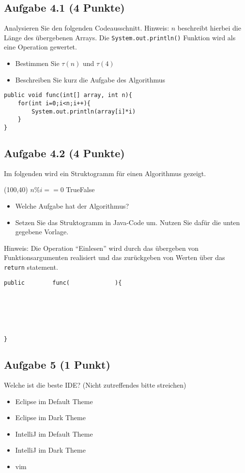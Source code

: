 \documentclass[a4paper,
			   fontsize=12pt]{article}
\begin{document}
\newpage
\subsection*{Aufgabe 4.1 (4 Punkte)}
Analysieren Sie den folgenden Codeausschnitt. Hinweis: $n$ beschreibt hierbei die Länge des übergebenen Arrays. Die \texttt{System.out.println()} Funktion wird als eine Operation gewertet.
\begin{itemize}
	\item Bestimmen Sie $\tau(n)$ und $\tau(4)$
	\item Beschreiben Sie kurz die Aufgabe des Algorithmus
\end{itemize}

\begin{lstlisting}
public void func(int[] array, int n){
	for(int i=0;i<n;i++){
		System.out.println(array[i]*i)
	}
}
\end{lstlisting}

\vspace{5cm}
\subsection*{Aufgabe 4.2 (4 Punkte)}
Im folgenden wird ein Struktogramm für einen Algorithmus gezeigt.

\begin{centernss}
	\begin{struktogramm}(100,40)
			{ \( n\%i==0 \) }{True}{False}
			\change
			\ifend
		\whileend
	\end{struktogramm}
\end{centernss}

\begin{itemize}
	\item Welche Aufgabe hat der Algorithmus?
	\item Setzen Sie das Struktogramm in Java-Code um. Nutzen Sie dafür die unten gegebene Vorlage.
\end{itemize}

\vspace{2,5cm}

Hinweis: Die Operation "`Einlesen"' wird durch das übergeben von Funktionsargumenten realisiert und das zurückgeben von Werten über das \texttt{return} statement.

\begin{lstlisting}
public        func(             ){






}
\end{lstlisting}

\subsection*{Aufgabe 5 (1 Punkt)}
Welche ist die beste IDE? (Nicht zutreffendes bitte streichen)
\begin{itemize}
	\item Eclipse im Default Theme
	\item Eclipse im Dark Theme
	\item IntelliJ im Default Theme
	\item IntelliJ im Dark Theme
	\item vim
\end{itemize}
\end{document}
